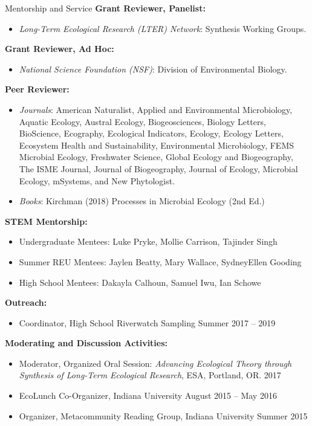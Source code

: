 \documentclass{resume} %
\begin{document}
\begin{rSection}{Mentorship and Service}
{\bf Grant Reviewer, Panelist:}
\begin{itemize}
  \item {\em Long-Term Ecological Research (LTER) Network}: Synthesis Working Groups.
\end{itemize}

{\bf Grant Reviewer, Ad Hoc:}
\begin{itemize}
  \item {\em National Science Foundation (NSF)}: Division of Environmental Biology.
\end{itemize}

{\bf Peer Reviewer:}
\begin{itemize}
  \item {\em Journals}: American Naturalist, Applied and Environmental Microbiology, Aquatic Ecology, Austral Ecology, Biogeosciences, Biology Letters, BioScience, Ecography, Ecological Indicators, Ecology, Ecology Letters, Ecosystem Health and Sustainability, Environmental Microbiology, FEMS Microbial Ecology, Freshwater Science, Global Ecology and Biogeography, The ISME Journal, Journal of Biogeography, Journal of Ecology, Microbial Ecology, mSystems, and New Phytologist.
  \item {\em Books}: Kirchman (2018) Processes in Microbial Ecology (2nd Ed.)
\end{itemize}

{\bf STEM Mentorship:}
\begin{itemize}
  \item Undergraduate Mentees: Luke Pryke, Mollie Carrison, Tajinder Singh
  \item Summer REU Mentees: Jaylen Beatty, Mary Wallace, SydneyEllen Gooding
  \item High School Mentees: Dakayla Calhoun, Samuel Iwu, Ian Schowe
\end{itemize}

{\bf Outreach:}
\begin{itemize}
  \item {Coordinator, High School Riverwatch Sampling} \hfill Summer 2017 -- 2019
\end{itemize}

{\bf Moderating and Discussion Activities:}
\begin{itemize}
  \item Moderator, Organized Oral Session: {\em Advancing Ecological Theory through Synthesis of Long-Term Ecological Research}, ESA, Portland, OR. \hfill 2017
  \item EcoLunch Co-Organizer, Indiana University \hfill August 2015 -- May 2016
  \item Organizer, Metacommunity Reading Group, Indiana University \hfill Summer 2015
\end{itemize}


\end{rSection}
\end{document}
